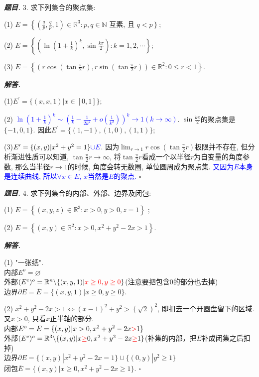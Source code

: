 \documentclass[10pt, a4paper, oneside]{ctexart}
\newenvironment{problem}{\begin{framed}\par\noindent\textbf{\textit{题目. }}}{\end{framed}\par}
\newenvironment{solution}{%
  \par\noindent\textbf{\textit{解答. }}\ignorespaces
}{%
  \hfill\ensuremath{\square}\par %
}
\begin{document}
\begin{problem}
3. 求下列集合的聚点集:

(1) $E=\left\{\left(\frac{q}{p}, \frac{q}{p}, 1\right) \in \mathbb{R}^3: p, q \in \mathbb{N}\right.$ 互素, 且 $\left.q<p\right\}$;

(2) $E=\left\{\left(\ln \left(1+\frac{1}{k}\right)^k, \sin \frac{k \pi}{2}\right): k=1,2, \cdots\right\}$;

(3) $E=\left\{\left(r \cos \left(\tan \frac{\pi}{2} r\right), r \sin \left(\tan \frac{\pi}{2} r\right)\right) \in \mathbb{R}^2: 0 \leqslant r<1\right\}$.
\end{problem}
\begin{solution}
    (1)$E^{\prime}=\{(x,x,1)|x\in[0,1]\}$;

    (2) \textcolor{blue}{$\ln(1+\frac{1}{k})^k \sim (\frac{1}{k}-\frac{1}{2k^2}+o(\frac{1}{k^2}))^k \to 1(k\to \infty)$}. $\sin \frac{k\pi}{2}$的聚点集是$\{-1,0,1\}$. 因此$E^{\prime}=\{(1,-1),(1,0),(1,1)\}$;

    (3)\textcolor{red}{$E^{\prime}=\{(x,y)|x^2+y^2=1\}\textcolor{blue}{\cup E}$}. 因为$\lim_{r\to 1}r\cos(\tan\frac{\pi}{2}r)$极限并不存在, 但分析渐进性质可以知道, $\tan\frac{\pi}{2}r\to \infty$, 将$\tan\frac{\pi}{2}r$看成一个以半径$r$为自变量的角度参数, 那么当半径$r\to 1$的时候, 角度会转无数圈, 单位圆周成为聚点集. \textcolor{blue}{又因为$E$本身是连续曲线, 所以$\forall x\in E$, $x$当然是$E$的聚点.}
\end{solution}

\begin{problem}
4. 求下列集合的内部、外部、边界及闭包:

(1) $E=\left\{(x, y, z) \in \mathbb{R}^3: x>0, y>0, z=1\right\}$ ;

(2) $E=\left\{(x, y) \in \mathbb{R}^2: x>0, x^2+y^2-2 x>1\right\}$.
\end{problem}
\begin{solution}
    (1) "一张纸".\\内部$E^{o}=\varnothing$\\外部$(E^{c})^{o}=\mathbb{R}^n \backslash \{(x,y,1)|\textcolor{red}{x\geq 0 , y\geq 0}\}$(注意要把包含$0$的部分也去掉)\\边界$\partial E= \overline{E} = \{(x,y,1)|x\geq 0, y\geq 0\}$.

    (2) $x^2+y^2-2x>1\iff (x-1)^2+y^2>(\sqrt{2})^2$, 即扣去一个开圆盘留下的区域. 又$x>0$, 只看$x$正半轴的部分.\\内部$E^{o}=E=\{(x,y)|x>0, x^2+y^2-2x\textcolor{red}{>} 1\}$\\外部$(E^{c})^{o}=\mathbb{R}^3\backslash \{(x,y)|x\textcolor{red}{\geq}0,x^2+y^2-2x\textcolor{red}{\geq}1\}$(补集的内部，把$E$补成闭集之后扣掉)\\边界$\partial E=\{(x,y)|x^2+y^2-2x=1\}\cup \{(0,y)|y^2\geq 1\}$\\闭包$\overline{E}=\{(x,y)|x\geq 0, x^2+y^2-2x\geq 1\}$.
\end{solution}
\end{document}
